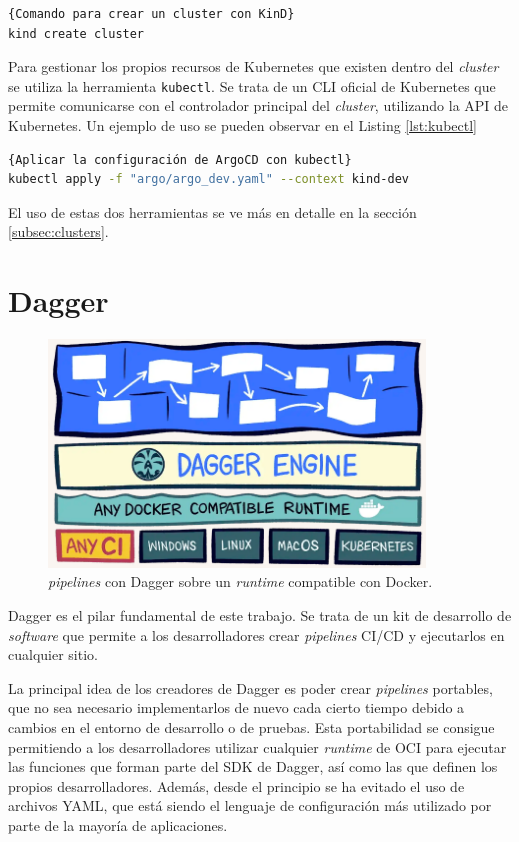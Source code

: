 \begin{lstlisting}[language=bash,label=lst:kindcc]{Comando para crear un cluster con KinD}
kind create cluster
\end{lstlisting}

Para gestionar los propios recursos de Kubernetes que existen dentro del \textit{cluster} se utiliza la herramienta \texttt{kubectl}\cite{kubectl}. Se trata de un CLI oficial de Kubernetes que permite comunicarse con el controlador principal del \textit{cluster}, utilizando la API de Kubernetes. Un ejemplo de uso se pueden observar en el Listing \ref{lst:kubectl}

\begin{lstlisting}[language=bash,label=lst:kubectl]{Aplicar la configuración de ArgoCD con kubectl}
kubectl apply -f "argo/argo_dev.yaml" --context kind-dev
\end{lstlisting}

El uso de estas dos herramientas se ve más en detalle en la sección \ref{subsec:clusters}.

\section{Dagger}

\begin{figure}
  \centerline{\includegraphics[width=10cm]{figuras/dagger}}
  \caption{\textit{pipelines} con Dagger sobre un \textit{runtime} compatible con Docker.\cite{img:dagger}}
  \label{fig:dagger}
\end{figure}

Dagger es el pilar fundamental de este trabajo. Se trata de un kit de desarrollo de \textit{software} que permite a los desarrolladores crear \textit{pipelines} CI/CD y ejecutarlos en cualquier sitio.

La principal idea de los creadores de Dagger es poder crear \textit{pipelines} portables, que no sea necesario implementarlos de nuevo cada cierto tiempo debido a cambios en el entorno de desarrollo o de pruebas. Esta portabilidad se consigue permitiendo a los desarrolladores utilizar cualquier \textit{runtime} de OCI para ejecutar las funciones que forman parte del SDK\cite{sdk} de Dagger, así como las que definen los propios desarrolladores. Además, desde el principio se ha evitado el uso de archivos YAML, que está siendo el lenguaje de configuración más utilizado por parte de la mayoría de aplicaciones.

